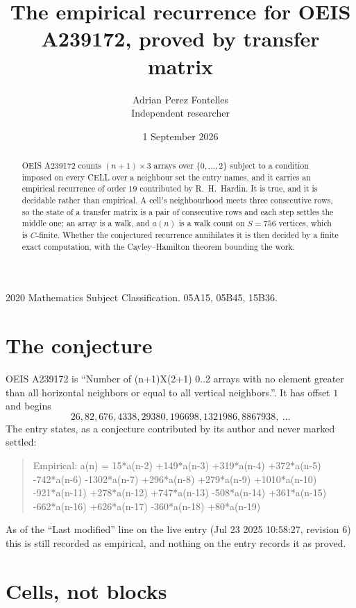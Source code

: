\documentclass[11pt,a4paper]{article}
\title{The empirical recurrence for OEIS A239172, proved by transfer matrix}
\author{Adrian Perez Fontelles\\ \small Independent researcher}
\date{1 September 2026}
\theoremstyle{plain}
\theoremstyle{definition}
\begin{document}
\maketitle

\begin{abstract}
OEIS A239172 counts $(n+1)\times3$ arrays over $\{0,\dots,2\}$ subject to a condition imposed on
every CELL over a neighbour set the entry names, and it carries an empirical recurrence of
order $19$ contributed by R.~H.~Hardin. It is true, and it is decidable rather than
empirical. A cell's neighbourhood meets three consecutive rows, so the state of a transfer
matrix is a pair of consecutive rows and each step settles the middle one; an array is a
walk, and $a(n)$ is a walk count on $S=756$ vertices, which is $C$-finite. Whether the
conjectured recurrence annihilates it is then decided by a finite exact computation, with the
Cayley--Hamilton theorem bounding the work.
\end{abstract}

\noindent\small 2020 Mathematics Subject Classification. 05A15, 05B45, 15B36.\normalsize

\section{The conjecture}

OEIS A239172 is ``Number of (n+1)X(2+1) 0..2 arrays with no element greater than all horizontal neighbors or equal to all vertical neighbors.''. It has offset $1$ and begins
\[
26, 82, 676, 4338, 29380, 196698, 1321986, 8867938,\ \dots
\]
The entry states, as a conjecture contributed by its author and never marked settled:
\begin{quote}
Empirical: a(n) = 15*a(n-2) +149*a(n-3) +319*a(n-4) +372*a(n-5) -742*a(n-6) -1302*a(n-7) +296*a(n-8) +279*a(n-9) +1010*a(n-10) -921*a(n-11) +278*a(n-12) +747*a(n-13) -508*a(n-14) +361*a(n-15) -662*a(n-16) +626*a(n-17) -360*a(n-18) +80*a(n-19)
\end{quote}
As of the ``Last modified'' line on the live entry (Jul 23 2025 10:58:27, revision 6) this is still
recorded as empirical, and nothing on the entry records it as proved.

\section{Cells, not blocks}
\end{document}

